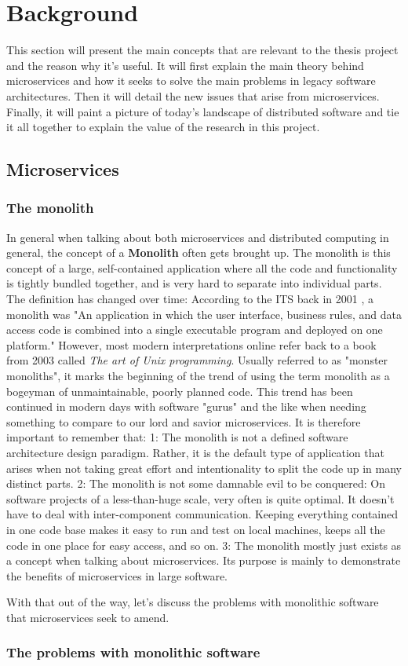 \chapter{Background}

\label{Chapter2}

This section will present the main concepts that are relevant to the thesis project and the reason why it's useful.
It will first explain the main theory behind microservices and how it seeks to solve the main problems in legacy software architectures. Then it will
detail the new issues that arise from microservices. Finally, it will paint a picture of today's landscape of distributed software and 
tie it all together to explain the value of the research in this project.

\section{Microservices}
\subsection{The monolith}
In general when talking about both microservices and distributed computing in general, the concept of a \textbf{Monolith} often gets brought up. 
The monolith is this concept of a large, self-contained application where all the code and functionality is tightly bundled together, and is very hard to separate into individual parts.
The definition has changed over time: According to the ITS back in 2001 \cite{ITS}, a monolith was "An application in which the user interface, business rules, and data access code is combined into a single executable program and deployed on one platform."
However, most modern interpretations online refer back to a book from 2003 called \textit{The art of Unix programming}. Usually referred to as "monster monoliths", it marks the beginning of the trend of using the term monolith as a bogeyman of unmaintainable, poorly planned code. 
This trend has been continued in modern days with software "gurus" and the like when needing something to compare to our lord and savior microservices\cite*{Gouigoux2017}.
It is therefore important to remember that:
1: The monolith is not a defined software architecture design paradigm. Rather, it is the default type of application that arises when not taking great effort and intentionality to split the code up in many distinct parts.
2: The monolith is not some damnable evil to be conquered: On software projects of a less-than-huge scale, very often is quite optimal. It doesn't have to deal with inter-component communication. Keeping everything contained in one code base makes it easy to run and test on local machines, keeps all the code in one place for easy access, and so on. 
3: The monolith mostly just exists as a concept when talking about microservices. Its purpose is mainly to demonstrate the benefits of microservices in large software.

With that out of the way, let's discuss the problems with monolithic software that microservices seek to amend.

\subsection{The problems with monolithic software}
